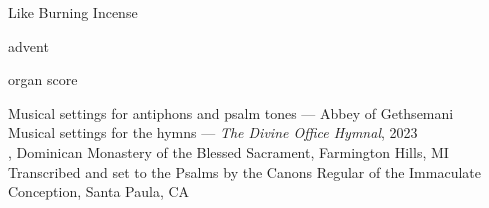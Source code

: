 \documentclass{lbi_organ_bind}
\begin{document}
\pagestyle{empty}

\null\vfill
\begin{center}
  \huge
  
  Like Burning Incense

  \bigskip\LARGE advent

  \vfill\vfill\Large organ score

\end{center}


\newpage

\null\vfill
\begin{center}
  \vfill\small
  Musical settings for antiphons and psalm tones --- Abbey of Gethsemani\\
  Musical settings for the hymns --- \emph{The Divine Office Hymnal}, 2023\\
  , Dominican Monastery of the Blessed Sacrament, Farmington Hills, MI\\
  Transcribed and set to the Psalms by the Canons Regular of the Immaculate Conception, Santa Paula, CA
\end{center}

\tableofcontents
\cleartoleftpage

\pagestyle{fancy}


\end{document}
